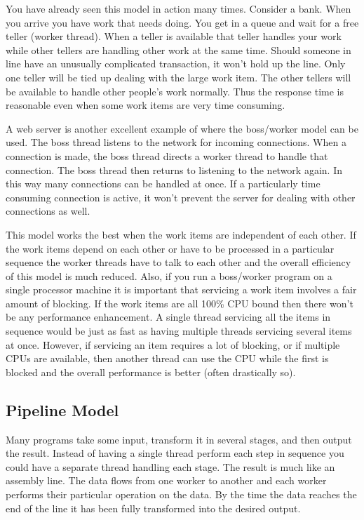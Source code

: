 You have already seen this model in action many times. Consider a bank. When you arrive you have
work that needs doing. You get in a queue and wait for a free teller (worker thread). When a
teller is available that teller handles your work while other tellers are handling other work at
the same time. Should someone in line have an unusually complicated transaction, it won't hold
up the line. Only one teller will be tied up dealing with the large work item. The other tellers
will be available to handle other people's work normally. Thus the response time is reasonable
even when some work items are very time consuming.

A web server is another excellent example of where the boss/worker model can be used. The boss
thread listens to the network for incoming connections. When a connection is made, the boss
thread directs a worker thread to handle that connection. The boss thread then returns to
listening to the network again. In this way many connections can be handled at once. If a
particularly time consuming connection is active, it won't prevent the server for dealing with
other connections as well.

This model works the best when the work items are independent of each other. If the work items
depend on each other or have to be processed in a particular sequence the worker threads have to
talk to each other and the overall efficiency of this model is much reduced. Also, if you run a
boss/worker program on a single processor machine it is important that servicing a work item
involves a fair amount of blocking. If the work items are all 100\% CPU bound then there won't
be any performance enhancement. A single thread servicing all the items in sequence would be
just as fast as having multiple threads servicing several items at once. However, if servicing
an item requires a lot of blocking, or if multiple CPUs are available, then another thread can
use the CPU while the first is blocked and the overall performance is better (often drastically
so).

\subsection{Pipeline Model}
\label{subsec:pipeline-model}

Many programs take some input, transform it in several stages, and then output the result.
Instead of having a single thread perform each step in sequence you could have a separate thread
handling each stage. The result is much like an assembly line. The data flows from one worker to
another and each worker performs their particular operation on the data. By the time the data
reaches the end of the line it has been fully transformed into the desired output.

